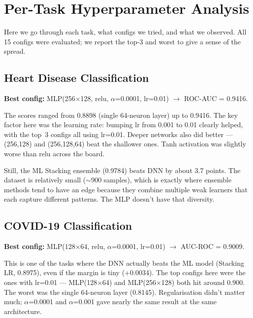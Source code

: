 \documentclass[11pt,a4paper]{article}
\begin{document}
\normalsize
\vspace{0.6em}

\section{Per-Task Hyperparameter Analysis}

Here we go through each task, what configs we tried, and what we observed. All 15 configs were evaluated; we report the top-3 and worst to give a sense of the spread.

\subsection{Heart Disease Classification}

\textbf{Best config:} MLP(256$\times$128, relu, $\alpha$=0.0001, lr=0.01) $\rightarrow$ ROC-AUC = 0.9416.

The scores ranged from 0.8898 (single 64-neuron layer) up to 0.9416. The key factor here was the learning rate: bumping lr from 0.001 to 0.01 clearly helped, with the top~3 configs all using lr=0.01. Deeper networks also did better --- (256,128) and (256,128,64) beat the shallower ones. Tanh activation was slightly worse than relu across the board.

Still, the ML Stacking ensemble (0.9784) beats DNN by about 3.7 points. The dataset is relatively small ($\sim$900 samples), which is exactly where ensemble methods tend to have an edge because they combine multiple weak learners that each capture different patterns. The MLP doesn't have that diversity.

\subsection{COVID-19 Classification}

\textbf{Best config:} MLP(128$\times$64, relu, $\alpha$=0.0001, lr=0.01) $\rightarrow$ AUC-ROC = 0.9009.

This is one of the tasks where the DNN actually beats the ML model (Stacking LR, 0.8975), even if the margin is tiny (+0.0034). The top configs here were the ones with lr=0.01 --- MLP(128$\times$64) and MLP(256$\times$128) both hit around 0.900. The worst was the single 64-neuron layer (0.8145). Regularisation didn't matter much; $\alpha$=0.0001 and $\alpha$=0.001 gave nearly the same result at the same architecture.
\end{document}
